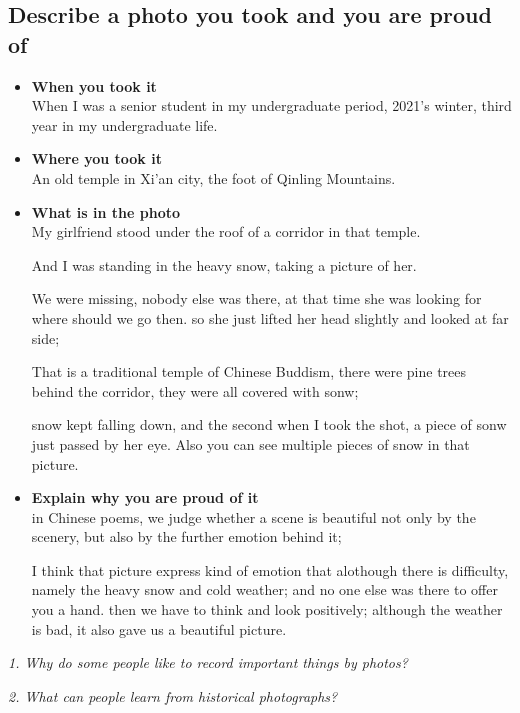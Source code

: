 \documentclass[conference]{IEEEtran}
\begin{document}
\subsection{Describe a photo you took and you are proud of}

\begin{itemize}
    \item \textbf{When you took it}\\
    When I was a senior student in my undergraduate period, 2021's winter, 
    third year in my undergraduate life.

    \item \textbf{Where you took it}\\
    An old temple in Xi'an city, the foot of Qinling Mountains.

    \item \textbf{What is in the photo}\\
    My girlfriend stood under the roof of a corridor in that temple.

    And I was standing in the heavy snow, taking a picture of her.
    
    We were missing, nobody else was there, at that time she was looking for where should we go then.
    so she just lifted her head slightly and looked at far side;

    That is a traditional temple of Chinese Buddism, there were pine trees behind the corridor, 
    they were all covered with sonw;
    
    snow kept falling down, and the second when I took the shot, a piece of sonw just passed by her eye. 
    Also you can see multiple pieces of snow in that picture. 
    
    \item \textbf{Explain why you are proud of it}\\
    in Chinese poems, we judge whether a scene is beautiful not only by the scenery, but also by the further emotion behind it;
    
    I think that picture express kind of emotion that alothough there is difficulty, namely the heavy snow and cold weather;
    and no one else was there to offer you a hand.
    then we have to think and look positively; although the weather is bad, it also gave us a beautiful picture.
\end{itemize}

\textit{1. Why do some people like to record important things by photos?}

\textit{2. What can people learn from historical photographs?}
\end{document}
